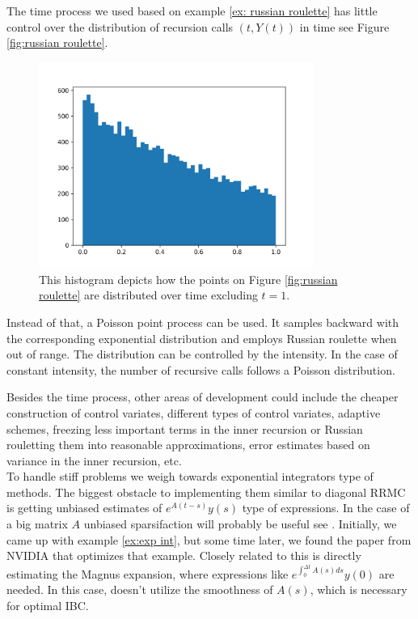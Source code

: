 \documentclass[a4paper,12pt]{article}
\begin{document}
\begin{pythonn}
\end{pythonn}

\vspace{0.5cm}

The time process we used based on example \ref{ex: russian roulette}
has little control over the distribution of recursion calls $(t,Y(t))$
in time see Figure \ref{fig:russian roulette}.

\begin{figure}[h!]
    \centering
    \includegraphics[width=0.8\textwidth]{plots/time proces.png}
    \caption{This histogram depicts how the points
        on Figure \ref{fig:russian roulette} are distributed over time
        excluding $t=1$.}
    \label{fig:time proces}
\end{figure}

Instead of that, a Poisson point process can be used.
It samples backward with the corresponding
exponential distribution and employs Russian roulette
when out of range. The distribution can be controlled by the intensity.
In the case of constant intensity, the number of recursive calls
follows a Poisson distribution.

Besides the time process, other areas of development could
include the cheaper construction of control variates,
different types of control variates, adaptive schemes,
freezing less important terms in the inner recursion or Russian rouletting
them into reasonable approximations, error estimates based on variance in the
inner recursion, etc. \\

To handle stiff problems we weigh towards exponential integrators
type of methods. The biggest obstacle to implementing them similar to diagonal RRMC
is getting unbiased estimates of $e^{A(t-s)} y(s)$ type of expressions. In the case
of a big matrix $A$  unbiased sparsifaction will probably be useful
see \cite{sabelfeld_sparsified_2009}.
Initially, we came up with example \ref{ex:exp int}, but some time later,
we found the paper from NVIDIA \cite{kettunen_unbiased_2021} that optimizes
that example. Closely related to this is directly estimating the Magnus expansion,
where expressions like $e^{\int_{0}^{\Delta t} A(s)ds} y(0)$ are needed.
In this case, \cite{kettunen_unbiased_2021} doesn't utilize the smoothness of
$A(s)$, which is necessary
for optimal IBC.
\end{document}
